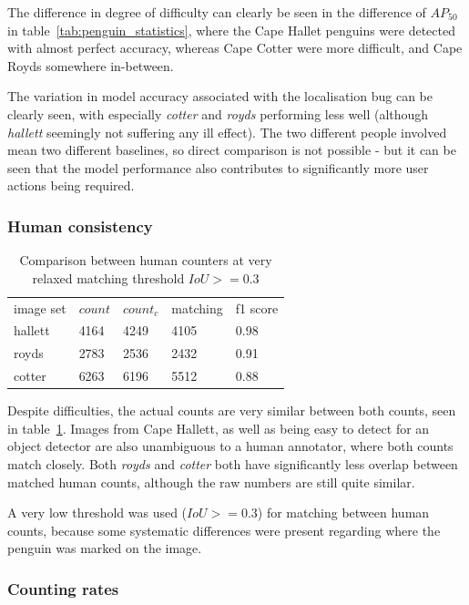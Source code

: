 The difference in degree of difficulty can clearly be seen in the difference of $AP_{50}$ in table~\ref{tab:penguin_statistics}, where the Cape Hallet penguins were detected with almost perfect accuracy, whereas Cape Cotter were more difficult, and Cape Royds somewhere in-between. 

The variation in model accuracy associated with the localisation bug can be clearly seen, with especially \emph{cotter} and \emph{royds} performing less well (although \emph{hallett} seemingly not suffering any ill effect). The two different people involved mean two different baselines, so direct comparison is not possible - but it can be seen that the model performance also contributes to significantly more user actions being required.


\subsubsection{Human consistency}

\begin{table}[h!]
\begin{tabular}{lllll}
image set & $count$ & $count_c$ & matching & f1 score \\
hallett   & 4164      & 4249      & 4105     & 0.98     \\
royds     & 2783      & 2536      & 2432     & 0.91     \\
cotter    & 6263      & 6196      & 5512     & 0.88    
\end{tabular}
\caption{Comparison between human counters at very relaxed matching threshold $IoU >= 0.3$}
\label{tab:human_comparison} 
\end{table}
 
Despite difficulties, the actual counts are very similar between both counts, seen in table~\ref{tab:human_comparison}. Images from Cape Hallett, as well as being easy to detect for an object detector are also unambiguous to a human annotator, where both counts match closely. Both \emph{royds} and \emph{cotter} both have significantly less overlap between matched human counts, although the raw numbers are still quite similar.

A very low threshold was used ($IoU >= 0.3$) for matching between human counts, because some systematic differences were present regarding where the penguin was marked on the image.

\subsubsection {Counting rates}

